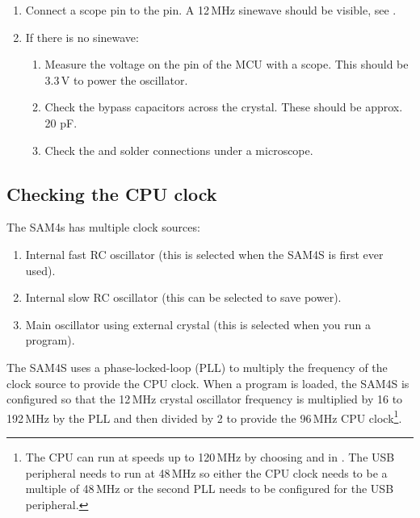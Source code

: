 \begin{enumerate}
\item Connect a scope pin to the  pin. A 12\,MHz sinewave
  should be visible, see .

\item If there is no sinewave:

  \begin{enumerate}
  \item Measure the voltage on the  pin of the MCU with a
    scope. This should be 3.3\,V to power the oscillator.

  \item Check the bypass capacitors across the crystal.  These should
    be approx. 20 pF.

  \item Check the  and  solder connections under a
    microscope.
  \end{enumerate}
\end{enumerate}


\subsection{Checking the CPU clock}
\label{checking-the-clock}

The SAM4s has multiple clock sources:

\begin{enumerate}
\item
  Internal fast RC oscillator (this is selected when the SAM4S is first
  ever used).
\item
  Internal slow RC oscillator (this can be selected to save power).
\item
  Main oscillator using external crystal (this is selected when you
  run a program).
\end{enumerate}

The SAM4S uses a phase-locked-loop (PLL) to multiply the frequency of
the clock source to provide the CPU clock.  When a program is loaded,
the SAM4S is configured so that the 12\,MHz crystal oscillator
frequency is multiplied by 16 to 192\,MHz by the PLL and then divided
by 2 to provide the 96\,MHz CPU clock\footnote{The CPU can run at
  speeds up to 120\,MHz by choosing  and
   in .  The USB peripheral needs to
  run at 48\,MHz so either the CPU clock needs to be a multiple of
  48\,MHz or the second PLL needs to be configured for the USB
  peripheral.}.

